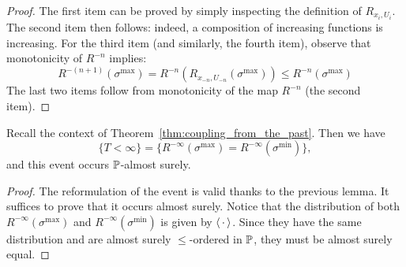 \begin{proof}
    The first item can be proved by simply inspecting the definition of $R_{x_i,U_i}$.
    The second item then follows: indeed, a composition of increasing functions is increasing.
    For the third item (and similarly, the fourth item), observe that monotonicity of $R^{-n}$ implies:
    \[
        R^{-(n+1)}(\sigma^{\max})
        =
        R^{-n}(R_{x_{-n},U_{-n}}(\sigma^{\max}))
        \leq
        R^{-n}(\sigma^{\max})
    \]
    The last two items follow from monotonicity of the map $R^{-n}$ (the second item).
\end{proof}


\begin{lemma}
    Recall the context of Theorem~\ref{thm:coupling_from_the_past}.
    Then we have
    \[
        \{T<\infty\}=\{R^{-\infty}(\sigma^{\max})=R^{-\infty}(\sigma^{\min})\},
    \]
    and this event occurs $\P$-almost surely.
\end{lemma}

\begin{proof}
    The reformulation of the event is valid thanks to the previous lemma.
    It suffices to prove that it occurs almost surely.
    Notice that the distribution of both $R^{-\infty}(\sigma^{\max})$ and $R^{-\infty}(\sigma^{\min})$
    is given by $\langle\blank\rangle$.
    Since they have the same distribution and are almost surely $\leq$-ordered in $\P$,
    they must be almost surely equal.
\end{proof}
